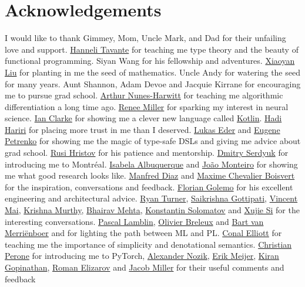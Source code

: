\documentclass[12pt,initial,twoside,maitrise]{dms}
\numberwithin{equation}{section}
\numberwithin{table}{chapter}
\numberwithin{figure}{chapter}
\begin{document}
\chapter*{Acknowledgements}
\vspace{-60pt} I would like to thank Gimmey, Mom, Uncle Mark, and Dad for their unfailing love and support. \href{http://hannelita.com/}{Hanneli Tavante} for teaching me type theory and the beauty of functional programming. Siyan Wang for his fellowship and adventures. \href{https://laverne.edu/directory/person/xiaoyan-liu/}{Xiaoyan Liu} for planting in me the seed of mathematics. Uncle Andy for watering the seed for many years. Aunt Shannon, Adam Devoe and Jacquie Kirrane for encouraging me to pursue grad school. \href{https://www.cs.rit.edu/~anh/}{Arthur Nunes-Harwitt} for teaching me algorithmic differentiation a long time ago. \href{https://www.sas.rochester.edu/bcs/people/faculty/miller_renee/index.html}{Renee Miller} for sparking my interest in neural science. \href{http://blog.locut.us}{Ian Clarke} for showing me a clever new language called \href{https://kotlinlang.org/}{Kotlin}. \href{https://hadihariri.com/}{Hadi Hariri} for placing more trust in me than I deserved. \href{https://www.jooq.org/}{Lukas Eder} and \href{https://jonnyzzz.com/}{Eugene Petrenko} for showing me the magic of type-safe DSLs and giving me advice about grad school. \href{https://github.com/rusi}{Rusi Hristov} for his patience and mentorship. \href{https://scholar.google.ca/citations?user=PsKlNzUAAAAJ}{Dmitry Serdyuk} for introducing me to Montr\'eal. \href{https://scholar.google.ca/citations?user=-Ss9QGkAAAAJ}{Isabela Albuquerque} and \href{https://scholar.google.ca/citations?user=hkO47vsAAAAJ}{Jo\~ao Monteiro} for showing me what good research looks like. \href{https://takeitallsource.github.io}{Manfred Diaz} and \href{https://pointersgonewild.com/}{Maxime Chevalier Boisvert} for the inspiration, conversations and feedback. \href{https://fgolemo.github.io/}{Florian Golemo} for his excellent engineering and architectural advice. \href{http://TurnerComputing.com}{Ryan Turner}, \href{https://saikrishna-1996.github.io}{Saikrishna Gottipati}, \href{https://maivincent.github.io}{Vincent Mai}, \href{https://krrish94.github.io/}{Krishna Murthy}, \href{https://bhairavmehta95.github.io/}{Bhairav Mehta}, \href{http://www.solomatov.me/}{Konstantin Solomatov} and \href{https://www.seas.upenn.edu/~xsi/}{Xujie Si} for the interesting conversations. \href{https://scholar.google.ca/citations?user=bn4xHHIAAAAJ}{Pascal Lamblin}, \href{http://breuleux.net}{Olivier Breleux} and \href{https://scholar.google.ca/citations?user=XE9SDzgAAAAJ}{Bart van Merri\"enboer} and for lighting the path between ML and PL. \href{http://conal.net/}{Conal Elliott} for teaching me the importance of simplicity and denotational semantics. \href{http://christianperone.com}{Christian Perone} for introducing me to PyTorch, \href{https://research.jetbrains.org/researchers/altavir}{Alexander Nozik}, \href{https://twitter.com/headinthebox}{Erik Meijer}, \href{https://scholar.google.com/citations?user=IcuGXgcAAAAJ}{Kiran Gopinathan}, \href{https://medium.com/@elizarov}{Roman Elizarov} and \href{https://cquic.unm.edu/member/jacob.miller/}{Jacob Miller} for their useful comments and feedback 
\end{document}
